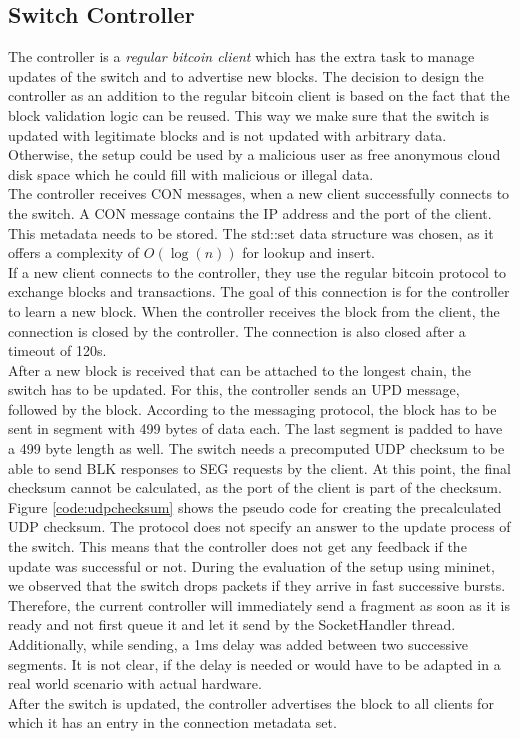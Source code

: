 \subsection{Switch Controller\label{design:SwitchController}}
The controller is a \textit{regular bitcoin client} which has the extra task to manage updates of the switch and to advertise new blocks. The decision to design the controller as an addition to the regular bitcoin client is based on the fact that the block validation logic can be reused. This way we make sure that the switch is updated with legitimate blocks and is not updated with arbitrary data. Otherwise, the setup could be used by a malicious user as free anonymous cloud disk space which he could fill with malicious or illegal data.\\
The controller receives CON messages, when a new client successfully connects to the switch. A CON message contains the IP address and the port of the client. This metadata needs to be stored. The std::set data structure was chosen, as it offers a complexity of $O(\log(n))$ for lookup and insert.\\
If a new client connects to the controller, they use the regular bitcoin protocol to exchange blocks and transactions. The goal of this connection is for the controller to learn a new block. When the controller receives the block from the client, the connection is closed by the controller. The connection is also closed after a timeout of 120s.\\
After a new block is received that can be attached to the longest chain, the switch has to be updated. For this, the controller sends an UPD message, followed by the block. According to the messaging protocol, the block has to be sent in segment with 499 bytes of data each. The last segment is padded to have a 499 byte length as well. The switch needs a precomputed UDP checksum to be able to send BLK responses to SEG requests by the client. At this point, the final checksum cannot be calculated, as the port of the client is part of the checksum. Figure \ref{code:udpchecksum} shows the pseudo code for creating the precalculated UDP checksum. The protocol does not specify an answer to the update process of the switch. This means that the controller does not get any feedback if the update was successful or not. During the evaluation of the setup using mininet, we observed that the switch drops packets if they arrive in fast successive bursts. Therefore, the current controller will immediately send a fragment as soon as it is ready and not first queue it and let it send by the SocketHandler thread. Additionally, while sending, a 1ms delay was added between two successive segments. It is not clear, if the delay is needed or would have to be adapted in a real world scenario with actual hardware.\\
After the switch is updated, the controller advertises the block to all clients for which it has an entry in the connection metadata set.


